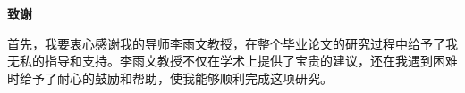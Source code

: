 \thispagestyle{previous}
\begin{center}
    \bfseries {} 致谢
\end{center}

首先，我要衷心感谢我的导师李雨文教授，在整个毕业论文的研究过程中给予了我无私的指导和支持。李雨文教授不仅在学术上提供了宝贵的建议，还在我遇到困难时给予了耐心的鼓励和帮助，使我能够顺利完成这项研究。